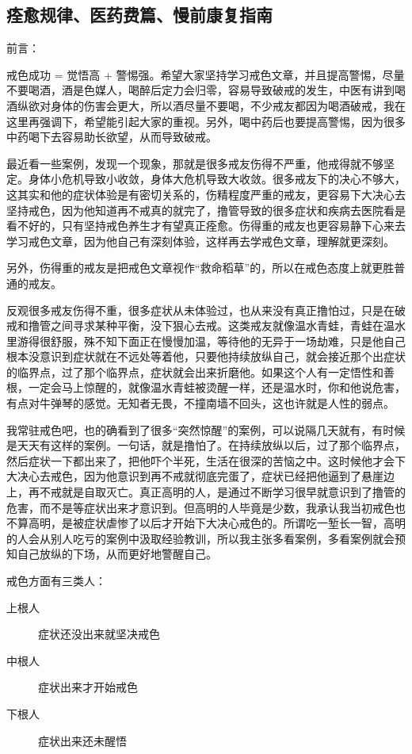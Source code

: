 \documentclass[fontset=founder]{ctexart}
\begin{document}
\subsection{痊愈规律、医药费篇、慢前康复指南}

前言：

戒色成功 = 觉悟高 + 警惕强。希望大家坚持学习戒色文章，并且提高警惕，尽量不要喝酒，酒是色媒人，喝醉后定力会归零，容易导致破戒的发生，中医有讲到喝酒纵欲对身体的伤害会更大，所以酒尽量不要喝，不少戒友都因为喝酒破戒，我在这里再强调下，希望能引起大家的重视。另外，喝中药后也要提高警惕，因为很多中药喝下去容易助长欲望，从而导致破戒。

最近看一些案例，发现一个现象，那就是很多戒友伤得不严重，他戒得就不够坚定。身体小危机导致小收敛，身体大危机导致大收敛。很多戒友下的决心不够大，这其实和他的症状体验是有密切关系的，伤精程度严重的戒友，更容易下大决心去坚持戒色，因为他知道再不戒真的就完了，撸管导致的很多症状和疾病去医院看是看不好的，只有坚持戒色养生才有望真正痊愈。伤得重的戒友也更容易静下心来去学习戒色文章，因为他自己有深刻体验，这样再去学戒色文章，理解就更深刻。

另外，伤得重的戒友是把戒色文章视作“救命稻草”的，所以在戒色态度上就更胜普通的戒友。

反观很多戒友伤得不重，很多症状从未体验过，也从来没有真正撸怕过，只是在破戒和撸管之间寻求某种平衡，没下狠心去戒。这类戒友就像温水青蛙，青蛙在温水里游得很舒服，殊不知下面正在慢慢加温，等待他的无异于一场劫难，只是他自己根本没意识到症状就在不远处等着他，只要他持续放纵自己，就会接近那个出症状的临界点，过了那个临界点，症状就会出来折磨他。如果这个人有一定悟性和善根，一定会马上惊醒的，就像温水青蛙被烫醒一样，还是温水时，你和他说危害，有点对牛弹琴的感觉。无知者无畏，不撞南墙不回头，这也许就是人性的弱点。

我常驻戒色吧，也的确看到了很多“突然惊醒”的案例，可以说隔几天就有，有时候是天天有这样的案例。一句话，就是撸怕了。在持续放纵以后，过了那个临界点，然后症状一下都出来了，把他吓个半死，生活在很深的苦恼之中。这时候他才会下大决心去戒色，因为他意识到再不戒就彻底完蛋了，症状已经把他逼到了悬崖边上，再不戒就是自取灭亡。真正高明的人，是通过不断学习很早就意识到了撸管的危害，而不是等症状出来才意识到。但高明的人毕竟是少数，我承认我当初戒色也不算高明，是被症状虐惨了以后才开始下大决心戒色的。所谓吃一堑长一智，高明的人会从别人吃亏的案例中汲取经验教训，所以我主张多看案例，多看案例就会预知自己放纵的下场，从而更好地警醒自己。

戒色方面有三类人：

\begin{description}
    \item[上根人] 症状还没出来就坚决戒色
    \item[中根人] 症状出来才开始戒色
    \item[下根人] 症状出来还未醒悟
\end{description}
\end{document}
